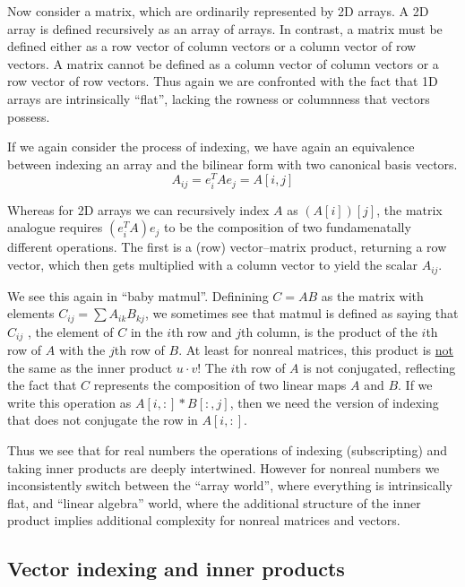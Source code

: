 Now consider a matrix, which are ordinarily represented by 2D arrays.
A 2D array is defined recursively as an array of arrays. In contrast,
a matrix must be defined either as a row vector of column vectors
or a column vector of row vectors. A matrix cannot be defined as a
column vector of column vectors or a row vector of row vectors. Thus
again we are confronted with the fact that 1D arrays are intrinsically
``flat'', lacking the rowness or columnness that vectors possess.

If we again consider the process of indexing, we have again an equivalence
between indexing an array and the bilinear form with two canonical
basis vectors.
\begin{equation}
A_{ij}=e_{i}^{T}Ae_{j}=A[i,j]
\end{equation}

Whereas for 2D arrays we can recursively index $A$ as $\left(A[i]\right)[j]$,
the matrix analogue requires $\left(e_{i}^{T}A\right)e_{j}$ to be
the composition of two fundamenatally different operations. The first
is a (row) vector–matrix product, returning a row vector, which then
gets multiplied with a column vector to yield the scalar $A_{ij}$.

We see this again in ``baby matmul''. Definining $C=AB$ as the
matrix with elements $C_{ij}=\sum A_{ik}B_{kj}$, we sometimes see
that matmul is defined as saying that $C_{ij}$ , the element of $C$
in the $i$th row and $j$th column, is the product of the $i$th
row of $A$ with the $j$th row of $B$. At least for nonreal matrices,
this product is \uline{not} the same as the inner product $u\cdot v$!
The $i$th row of $A$ is not conjugated, reflecting the fact that
$C$ represents the composition of two linear maps $A$ and $B$.
If we write this operation as $A[i,:]*B[:,j]$, then we need the version
of indexing that does not conjugate the row in $A[i,:]$.

Thus we see that for real numbers the operations of indexing (subscripting)
and taking inner products are deeply intertwined. However for nonreal
numbers we inconsistently switch between the ``array world'', where
everything is intrinsically flat, and ``linear algebra'' world,
where the additional structure of the inner product implies additional
complexity for nonreal matrices and vectors.


\subsection{Vector indexing and inner products}

